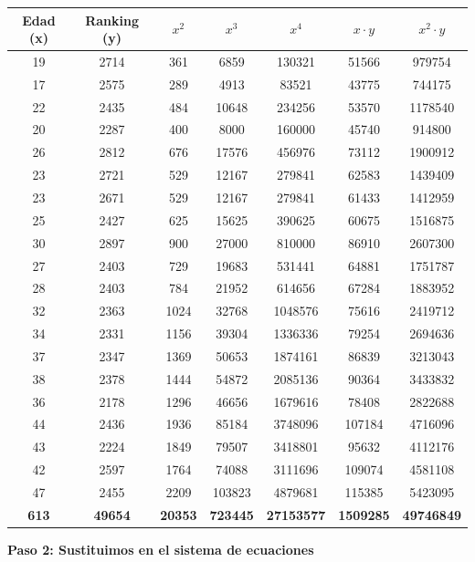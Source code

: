 \documentclass[12pt]{article}
\begin{document}
\begin{center}
\renewcommand{\arraystretch}{1.2}
\begin{tabular}{|c|c|c|c|c|c|c|}
\hline
\textbf{Edad (x)} & \textbf{Ranking (y)} & \(x^2\) & \(x^3\) & \(x^4\) & \(x \cdot y\) & \(x^2 \cdot y\) \\
\hline
19 & 2714 & 361 & 6859 & 130321 & 51566 & 979754 \\
17 & 2575 & 289 & 4913 & 83521 & 43775 & 744175 \\
22 & 2435 & 484 & 10648 & 234256 & 53570 & 1178540 \\
20 & 2287 & 400 & 8000 & 160000 & 45740 & 914800 \\
26 & 2812 & 676 & 17576 & 456976 & 73112 & 1900912 \\
23 & 2721 & 529 & 12167 & 279841 & 62583 & 1439409 \\
23 & 2671 & 529 & 12167 & 279841 & 61433 & 1412959 \\
25 & 2427 & 625 & 15625 & 390625 & 60675 & 1516875 \\
30 & 2897 & 900 & 27000 & 810000 & 86910 & 2607300 \\
27 & 2403 & 729 & 19683 & 531441 & 64881 & 1751787 \\
28 & 2403 & 784 & 21952 & 614656 & 67284 & 1883952 \\
32 & 2363 & 1024 & 32768 & 1048576 & 75616 & 2419712 \\
34 & 2331 & 1156 & 39304 & 1336336 & 79254 & 2694636 \\
37 & 2347 & 1369 & 50653 & 1874161 & 86839 & 3213043 \\
38 & 2378 & 1444 & 54872 & 2085136 & 90364 & 3433832 \\
36 & 2178 & 1296 & 46656 & 1679616 & 78408 & 2822688 \\
44 & 2436 & 1936 & 85184 & 3748096 & 107184 & 4716096 \\
43 & 2224 & 1849 & 79507 & 3418801 & 95632 & 4112176 \\
42 & 2597 & 1764 & 74088 & 3111696 & 109074 & 4581108 \\
47 & 2455 & 2209 & 103823 & 4879681 & 115385 & 5423095 \\
\hline
\textbf{613} & \textbf{49654} & \textbf{20353} & \textbf{723445} & \textbf{27153577} & \textbf{1509285} & \textbf{49746849} \\
\hline
\end{tabular}
\end{center}

\vspace{3cm}
\textbf{Paso 2: Sustituimos en el sistema de ecuaciones}
\end{document}
